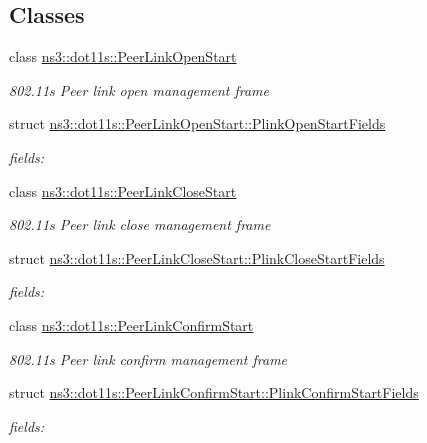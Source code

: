 \subsection*{Classes}
\begin{DoxyCompactItemize}
\item 
class \hyperlink{classns3_1_1dot11s_1_1PeerLinkOpenStart}{ns3\+::dot11s\+::\+Peer\+Link\+Open\+Start}
\begin{DoxyCompactList}\small\item\em 802.\+11s Peer link open management frame \end{DoxyCompactList}\item 
struct \hyperlink{structns3_1_1dot11s_1_1PeerLinkOpenStart_1_1PlinkOpenStartFields}{ns3\+::dot11s\+::\+Peer\+Link\+Open\+Start\+::\+Plink\+Open\+Start\+Fields}
\begin{DoxyCompactList}\small\item\em fields\+: \end{DoxyCompactList}\item 
class \hyperlink{classns3_1_1dot11s_1_1PeerLinkCloseStart}{ns3\+::dot11s\+::\+Peer\+Link\+Close\+Start}
\begin{DoxyCompactList}\small\item\em 802.\+11s Peer link close management frame \end{DoxyCompactList}\item 
struct \hyperlink{structns3_1_1dot11s_1_1PeerLinkCloseStart_1_1PlinkCloseStartFields}{ns3\+::dot11s\+::\+Peer\+Link\+Close\+Start\+::\+Plink\+Close\+Start\+Fields}
\begin{DoxyCompactList}\small\item\em fields\+: \end{DoxyCompactList}\item 
class \hyperlink{classns3_1_1dot11s_1_1PeerLinkConfirmStart}{ns3\+::dot11s\+::\+Peer\+Link\+Confirm\+Start}
\begin{DoxyCompactList}\small\item\em 802.\+11s Peer link confirm management frame \end{DoxyCompactList}\item 
struct \hyperlink{structns3_1_1dot11s_1_1PeerLinkConfirmStart_1_1PlinkConfirmStartFields}{ns3\+::dot11s\+::\+Peer\+Link\+Confirm\+Start\+::\+Plink\+Confirm\+Start\+Fields}
\begin{DoxyCompactList}\small\item\em fields\+: \end{DoxyCompactList}\end{DoxyCompactItemize}
